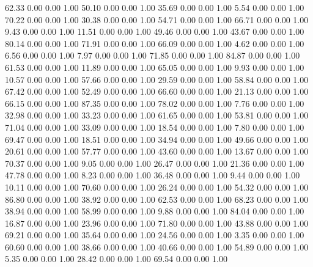    62.33   0.00   0.00   1.00
   50.10   0.00   0.00   1.00
   35.69   0.00   0.00   1.00
    5.54   0.00   0.00   1.00
   70.22   0.00   0.00   1.00
   30.38   0.00   0.00   1.00
   54.71   0.00   0.00   1.00
   66.71   0.00   0.00   1.00
    9.43   0.00   0.00   1.00
   11.51   0.00   0.00   1.00
   49.46   0.00   0.00   1.00
   43.67   0.00   0.00   1.00
   80.14   0.00   0.00   1.00
   71.91   0.00   0.00   1.00
   66.09   0.00   0.00   1.00
    4.62   0.00   0.00   1.00
    6.56   0.00   0.00   1.00
    7.97   0.00   0.00   1.00
   71.85   0.00   0.00   1.00
   84.87   0.00   0.00   1.00
   61.53   0.00   0.00   1.00
   11.89   0.00   0.00   1.00
   65.05   0.00   0.00   1.00
    9.93   0.00   0.00   1.00
   10.57   0.00   0.00   1.00
   57.66   0.00   0.00   1.00
   29.59   0.00   0.00   1.00
   58.84   0.00   0.00   1.00
   67.42   0.00   0.00   1.00
   52.49   0.00   0.00   1.00
   66.60   0.00   0.00   1.00
   21.13   0.00   0.00   1.00
   66.15   0.00   0.00   1.00
   87.35   0.00   0.00   1.00
   78.02   0.00   0.00   1.00
    7.76   0.00   0.00   1.00
   32.98   0.00   0.00   1.00
   33.23   0.00   0.00   1.00
   61.65   0.00   0.00   1.00
   53.81   0.00   0.00   1.00
   71.04   0.00   0.00   1.00
   33.09   0.00   0.00   1.00
   18.54   0.00   0.00   1.00
    7.80   0.00   0.00   1.00
   69.47   0.00   0.00   1.00
   18.51   0.00   0.00   1.00
   34.94   0.00   0.00   1.00
   49.66   0.00   0.00   1.00
   20.61   0.00   0.00   1.00
   57.77   0.00   0.00   1.00
   43.60   0.00   0.00   1.00
   13.67   0.00   0.00   1.00
   70.37   0.00   0.00   1.00
    9.05   0.00   0.00   1.00
   26.47   0.00   0.00   1.00
   21.36   0.00   0.00   1.00
   47.78   0.00   0.00   1.00
    8.23   0.00   0.00   1.00
   36.48   0.00   0.00   1.00
    9.44   0.00   0.00   1.00
   10.11   0.00   0.00   1.00
   70.60   0.00   0.00   1.00
   26.24   0.00   0.00   1.00
   54.32   0.00   0.00   1.00
   86.80   0.00   0.00   1.00
   38.92   0.00   0.00   1.00
   62.53   0.00   0.00   1.00
   68.23   0.00   0.00   1.00
   38.94   0.00   0.00   1.00
   58.99   0.00   0.00   1.00
    9.88   0.00   0.00   1.00
   84.04   0.00   0.00   1.00
   16.87   0.00   0.00   1.00
   23.96   0.00   0.00   1.00
   71.80   0.00   0.00   1.00
   43.88   0.00   0.00   1.00
   69.21   0.00   0.00   1.00
   35.64   0.00   0.00   1.00
   24.56   0.00   0.00   1.00
    3.35   0.00   0.00   1.00
   60.60   0.00   0.00   1.00
   38.66   0.00   0.00   1.00
   40.66   0.00   0.00   1.00
   54.89   0.00   0.00   1.00
    5.35   0.00   0.00   1.00
   28.42   0.00   0.00   1.00
   69.54   0.00   0.00   1.00
